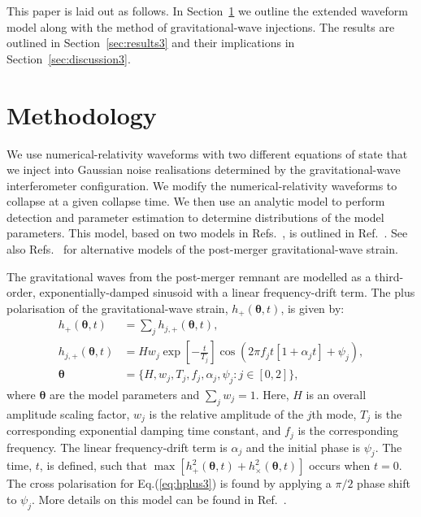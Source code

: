 \documentclass[../Thesis.tex]{subfiles}
\begin{document}
    This paper is laid out as follows. In Section~\ref{sec:methodology3} we outline the extended waveform model along with the method of gravitational-wave injections.
    The results are outlined in Section~\ref{sec:results3} and their implications in Section~\ref{sec:discussion3}.
 
    \vspace{-0.25cm}
    \section{Methodology}\label{sec:methodology3}
    We use numerical-relativity waveforms with two different equations of state that we inject into Gaussian noise realisations determined by the gravitational-wave interferometer configuration.
    We modify the numerical-relativity waveforms to collapse at a given collapse time.
    We then use an analytic model to perform detection and parameter estimation to determine distributions of the model parameters.
    This model, based on two models in Refs.~\cite{Bauswein2016,Bose2018}, is outlined in Ref.~\cite{Easter2020}.
    See also Refs.~\cite{Tsang2019,Breschi2019} for alternative models of the post-merger gravitational-wave strain.
 
    
    

        The gravitational waves from the post-merger remnant are modelled as a third-order, exponentially-damped sinusoid with a linear frequency-drift term. The plus polarisation of the gravitational-wave strain, $h_{+}(\boldsymbol{\theta},t)$, is given by: 
\begin{align}
        h_{+}(\boldsymbol{\theta},t) & = \sum_{j} h_{j,+}(\boldsymbol{\theta},t),\nonumber\\
        h_{j,+}(\boldsymbol{\theta},t) & = 
        H w_j \exp\left[-\frac{t}{T_j}\right] \cos \left(2\pi f_j t\left[1+\alpha_j t\right]+\psi_j \right),\nonumber\\
        \boldsymbol{\theta} & = \{H,w_j,T_j,f_j,\alpha_j,\psi_j :  j \in [0,2] \},\label{eq:hplus3}
\end{align}
    where $\boldsymbol{\theta}$ are the model parameters and $\sum_{j} w_j=1$. 
    Here, $H$ is an overall amplitude scaling factor, $w_j$ is the relative amplitude of the $j$th mode, $T_j$ is the corresponding exponential damping time constant, and $f_j$ is the corresponding frequency.
    The linear frequency-drift term is $\alpha_j$ and the initial phase  is $\psi_j$.
    The time, $t$, is defined, such that $\max\left[h_+^2(\boldsymbol{\theta},t)+h_\times^2(\boldsymbol{\theta},t)\right]$ occurs when $t=0$. 
    The cross polarisation for Eq.(\ref{eq:hplus3}) is found by applying a $\pi/2$ phase shift to $\psi_j$.
    More details on this model can be found in Ref.~\cite{Easter2020}.
    
\end{document}
